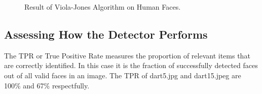 \documentclass[a4paper]{article}
\begin{document}
\begin{figure}[H]
  \centering
  \hfill
   \hfill
   \hfill
   \hfill
   \hfill
   \caption{Result of Viola-Jones Algorithm on Human Faces.}
\end{figure}

\subsection{Assessing How the Detector Performs}

The TPR or True Positive Rate measures the proportion of relevant items that
are correctly identified. In this case it is the fraction of successfully
detected faces out of all valid faces in an image. The TPR of dart5.jpg and
dart15.jpeg are 100\% and 67\% respectfully.
\end{document}

